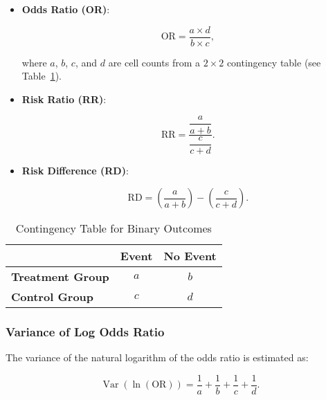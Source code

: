 \documentclass[12pt,a4paper]{report}
\newcommand{\Var}{\operatorname{Var}}
\begin{document}
\begin{itemize}
    \item \textbf{Odds Ratio (OR)}:

    \begin{equation}
    \label{eq:odds_ratio}
    \text{OR} = \frac{a \times d}{b \times c},
    \end{equation}

    where $a$, $b$, $c$, and $d$ are cell counts from a $2 \times 2$ contingency table (see Table~\ref{tab:contingency_table}).

    \item \textbf{Risk Ratio (RR)}:

    \begin{equation}
    \label{eq:risk_ratio}
    \text{RR} = \frac{\dfrac{a}{a + b}}{\dfrac{c}{c + d}}.
    \end{equation}

    \item \textbf{Risk Difference (RD)}:

    \begin{equation}
    \label{eq:risk_difference}
    \text{RD} = \left( \frac{a}{a + b} \right) - \left( \frac{c}{c + d} \right).
    \end{equation}
\end{itemize}

\begin{table}[H]
\centering
\caption{Contingency Table for Binary Outcomes}
\label{tab:contingency_table}
\begin{tabular}{lcc}
\toprule
 & \textbf{Event} & \textbf{No Event} \\
\midrule
\textbf{Treatment Group} & $a$ & $b$ \\
\textbf{Control Group} & $c$ & $d$ \\
\bottomrule
\end{tabular}
\end{table}

\subsubsection{Variance of Log Odds Ratio}

The variance of the natural logarithm of the odds ratio is estimated as:

\begin{equation}
\label{eq:var_log_or}
\Var\left( \ln(\text{OR}) \right) = \frac{1}{a} + \frac{1}{b} + \frac{1}{c} + \frac{1}{d}.
\end{equation}
\end{document}
